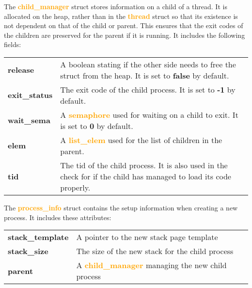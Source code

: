\documentclass{report}
\newcommand{\file}[1]{\textcolor{YellowGreen}{\textbf{#1}}}
\newcommand{\struct}[1]{\textcolor{orange}{\textbf{#1}}}
\newcommand{\var}[1]{\textcolor{RoyalPurple}{\textbf{#1}}}
\newcommand{\const}[1]{\textcolor{BrickRed}{\textbf{#1}}}
\newcommand{\pintoscode}[4]{}
\newcommand{\pintosfile}[3]{\pintoscode{#1}{#2}{\file{#3}}{#3}}
\begin{document}
                The \struct{child\_manager} struct stores information on a child of a thread. It is allocated on the heap, rather than in 
                the \struct{thread} struct so that its existence is not dependent on that of the child or parent. This ensures that the exit
                codes of the children are preserved for the parent if it is running. It includes the following fields:
								\begin{center}
									\begin{tabular}{l p{10cm}}
											\vspace*{2mm}
											\var{release}         & A boolean stating if the other side needs to free the struct from the heap. It is set to \const{false} by default. \\ \vspace*{2mm}
											\var{exit\_status} 		& The exit code of the child process. It is set to \const{-1} by default. \\ \vspace*{2mm}
											\var{wait\_sema}      & A \struct{semaphore} used for waiting on a child to exit. It is set to \const{0} by default. \\ \vspace*{2mm}
											\var{elem}            & A \struct{list\_elem} used for the list of children in the parent. \\ \vspace*{2mm}
											\var{tid}          		& The tid of the child process. It is also used in the check for if the child has managed to load its code properly. \\
									\end{tabular}
								\end{center}
                
                \pintosfile{30}{35}{process.c}
                The \struct{process\_info} struct contains the setup information when creating a new process. It includes these attributes:
								\begin{center}
									\begin{tabular}{l p{10cm}}
											\vspace*{2mm}
											\var{stack\_template} & A pointer to the new stack page template \\ \vspace*{2mm}
											\var{stack\_size} 		& The size of the new stack for the child process\\ \vspace*{2mm}
											\var{parent}      		& A \struct{child\_manager} managing the new child process \\
									\end{tabular}
								\end{center}
\end{document}
